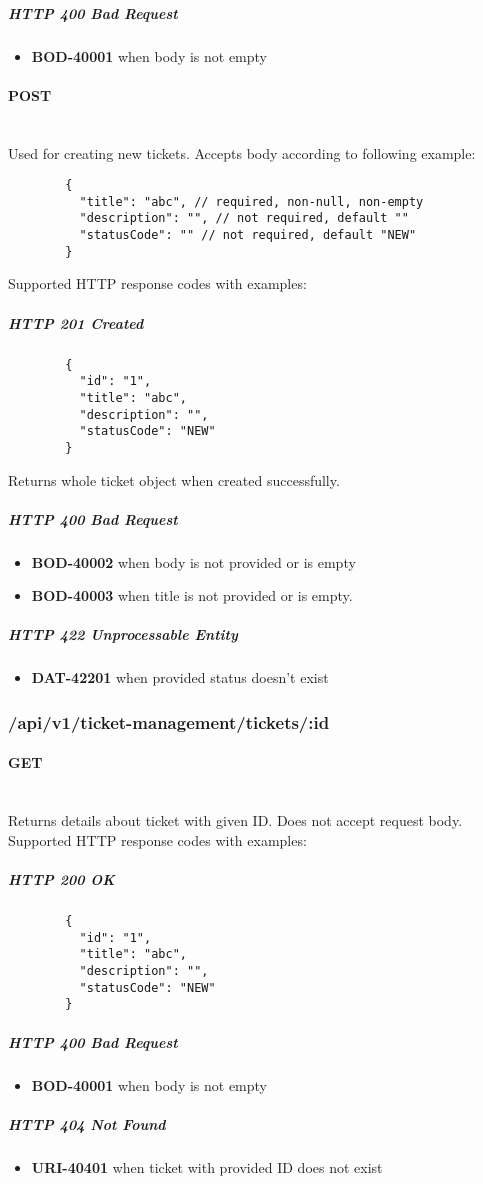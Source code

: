 \documentclass[a4paper]{article}
\newcommand{\newLineParagraph}[1]{\paragraph{#1}\mbox{}\\}
\begin{document}
    \subparagraph{HTTP 400 Bad Request}
    \begin{itemize}
        \item \textbf{BOD-40001} when body is not empty
    \end{itemize}

    \newLineParagraph{POST}
    Used for creating new tickets. Accepts body according to following example:
    \begin{verbatim}
        {
          "title": "abc", // required, non-null, non-empty
          "description": "", // not required, default ""
          "statusCode": "" // not required, default "NEW"
        }
    \end{verbatim}
    Supported HTTP response codes with examples:
    \subparagraph{HTTP 201 Created}
    \begin{verbatim}
        {
          "id": "1",
          "title": "abc",
          "description": "",
          "statusCode": "NEW"
        }
    \end{verbatim}
    Returns whole ticket object when created successfully.

    \subparagraph{HTTP 400 Bad Request}
    \begin{itemize}
        \item \textbf{BOD-40002} when body is not provided or is empty
        \item \textbf{BOD-40003} when title is not provided or is empty.
    \end{itemize}

    \subparagraph{HTTP 422 Unprocessable Entity}
    \begin{itemize}
        \item \textbf{DAT-42201} when provided status doesn't exist
    \end{itemize}

    \subsubsection{/api/v1/ticket-management/tickets/:id}
    \newLineParagraph{GET}
    Returns details about ticket with given ID. Does not accept request body. \\
    Supported HTTP response codes with examples:
    \subparagraph{HTTP 200 OK}
    \begin{verbatim}
        {
          "id": "1",
          "title": "abc",
          "description": "",
          "statusCode": "NEW"
        }
    \end{verbatim}
    \subparagraph{HTTP 400 Bad Request}
    \begin{itemize}
        \item \textbf{BOD-40001} when body is not empty
    \end{itemize}
    \subparagraph{HTTP 404 Not Found}
    \begin{itemize}
        \item \textbf{URI-40401} when ticket with provided ID does not exist
    \end{itemize}
\end{document}
